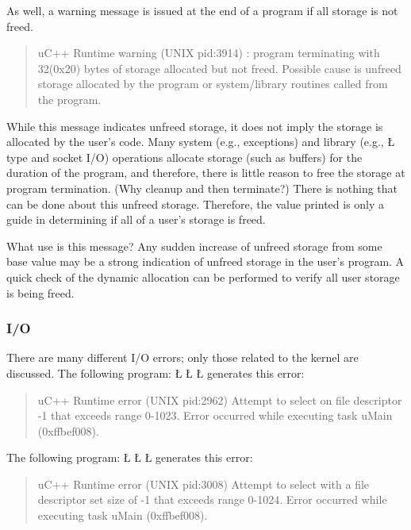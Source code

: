 \documentclass[openright,twoside]{report}
\begin{document}
As well, a warning message is issued at the end of a program if all storage is not freed.
\begin{quote}
\BGfont
uC++ Runtime warning (UNIX pid:3914) : program terminating with 32(0x20) bytes of storage allocated but not freed.
Possible cause is unfreed storage allocated by the program or system/library routines called from the program.
\end{quote}
While this message indicates unfreed storage, it does not imply the storage is allocated by the user's code.
Many system (e.g., exceptions) and library (e.g., \LGinlinetrue\LGbegin\lgrinde\L{}\endlgrinde\LGend{} type and socket I/O) operations allocate storage (such as buffers) for the duration of the program, and therefore, there is little reason to free the storage at program termination.
(Why cleanup and then terminate?)
There is nothing that can be done about this unfreed storage.
Therefore, the value printed is only a guide in determining if all of a user's storage is freed.

What use is this message?
Any sudden increase of unfreed storage from some base value may be a strong indication of unfreed storage in the user's program.
A quick check of the dynamic allocation can be performed to verify all user storage is being freed.


\subsubsection{I/O}

There are many different I/O errors;
only those related to the \uC kernel are discussed.
The following program:
\LGinlinefalse\LGbegin\lgrinde
\L{}
\L{\LB{}}
\L{\LB{\}}}
\endlgrinde\LGend
generates this error:
\begin{quote}
\BGfont
uC++ Runtime error (UNIX pid:2962) Attempt to select on file descriptor -1 that exceeds range 0-1023.
Error occurred while executing task uMain (0xffbef008).
\end{quote}

The following program:
\LGinlinefalse\LGbegin\lgrinde
\L{}
\L{\LB{}}
\L{\LB{\}}}
\endlgrinde\LGend
generates this error:
\begin{quote}
\BGfont
uC++ Runtime error (UNIX pid:3008) Attempt to select with a file descriptor set size of -1 that exceeds range 0-1024.
Error occurred while executing task uMain (0xffbef008).
\end{quote}
\end{document}
